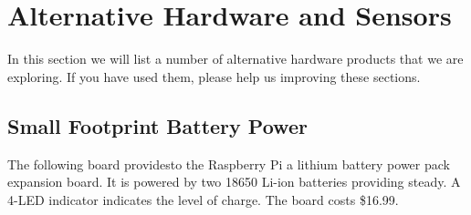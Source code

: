 \section{Alternative Hardware and Sensors}

In this section we will list a number of alternative hardware products
that we are exploring. If you have used them, please help us improving
these sections.

\subsection{Small Footprint Battery Power}

The following board providesto the Raspberry Pi a lithium battery
power pack expansion board. It is powered by two 18650 Li-ion
batteries providing steady. A 4-LED indicator indicates the level of
charge. The board costs \$16.99.


